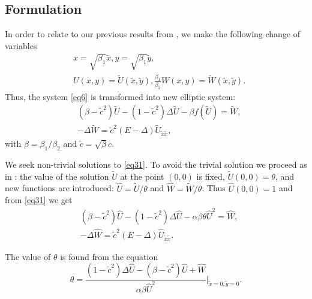 \documentclass[12pt]{article}
\theoremstyle{theorem}
\theoremstyle{defi}
\begin{document}
\subsection{Formulation}


In order to relate to our previous results from \cite{ref14, ref15}, we make the following change of variables
\begin{equation}\label{eqVCN}
\begin{split}
&x=\sqrt{\beta_1} { \tilde{x} }, y=\sqrt{\beta_1} { \tilde{ y} },\\
&U(x,y)= \tilde U({ \tilde{x} },{ \tilde{y} } ), \frac{\beta_1}{\beta_2} W(x,y)=  \tilde W({ \tilde{x} },{ \tilde{y} } ).
\end{split}
\end{equation}
Thus, the system \eqref{eq6} is transformed into new elliptic system:
\begin{equation}\label{eq31}
\begin{split}
&(\beta-\tilde c ^2) \tilde U  -(1- \tilde c^2) \Delta \tilde U - \beta f( \tilde U ) = \tilde W, \\
&-\Delta \tilde W = \tilde c^2 (E- \Delta) \tilde U_{\tilde x \tilde x},
\end{split}
\end{equation}
with $\beta = \beta_1 / \beta_2$ and $ \tilde c = \sqrt {\beta} c$.

We seek  non-trivial solutions to \eqref{eq31}. To avoid the trivial solution we proceed as in \cite{ref6}: the value of the solution $\tilde U$ at the point $(0,0)$ is fixed,  $\tilde U(0,0)=\theta $, and new  functions are introduced: $\widehat{U}=\tilde U /{\theta} $ and $\widehat{W}=\tilde W /{\theta} $. Thus
$ \widehat{U}(0,0)=1$ and from \eqref{eq31} we get
\begin{equation}\label{eq32}
\begin{split}
& (\beta-\tilde c^2) \widehat{U}  -(1-\tilde c^2) \Delta \widehat{U} - \alpha \beta \theta \widehat{U}^2 = \widehat{W}, \\
&-\Delta \widehat{W} = \tilde c^2 (E- \Delta) \widehat{U}_{\tilde x \tilde x}.
\end{split}
\end{equation}

The value of $\theta $ is found from the  equation
\begin{equation}\label{eqtheta}
\theta = \frac{ (1-\tilde c^2 )\Delta \widehat{U} - (\beta-\tilde c^2) \widehat{U} +\widehat{W}}{\alpha \beta \widehat{U}^2} |_{\tilde x=0,\tilde y=0} .
\end{equation}
\end{document}

